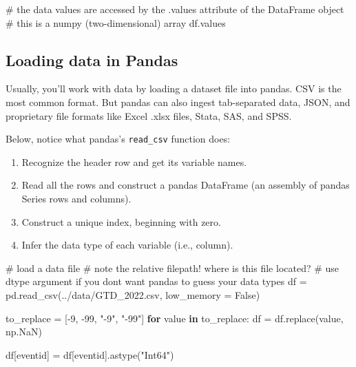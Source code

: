 \documentclass[
  letterpaper,
  DIV=11,
  numbers=noendperiod]{scrreprt}
\newenvironment{Shaded}{\begin{snugshade}}{\end{snugshade}}
\newcommand{\CommentTok}[1]{\textcolor[rgb]{0.37,0.37,0.37}{#1}}
\newcommand{\ControlFlowTok}[1]{\textcolor[rgb]{0.00,0.23,0.31}{\textbf{#1}}}
\newcommand{\DecValTok}[1]{\textcolor[rgb]{0.68,0.00,0.00}{#1}}
\newcommand{\KeywordTok}[1]{\textcolor[rgb]{0.00,0.23,0.31}{\textbf{#1}}}
\newcommand{\NormalTok}[1]{\textcolor[rgb]{0.00,0.23,0.31}{#1}}
\newcommand{\OperatorTok}[1]{\textcolor[rgb]{0.37,0.37,0.37}{#1}}
\newcommand{\StringTok}[1]{\textcolor[rgb]{0.13,0.47,0.30}{#1}}
\newcommand{\VariableTok}[1]{\textcolor[rgb]{0.07,0.07,0.07}{#1}}
\providecommand{\tightlist}{%
  \setlength{\itemsep}{0pt}\setlength{\parskip}{0pt}}\usepackage{longtable,booktabs,array}
\begin{document}
\begin{Shaded}
\begin{Highlighting}[]
\CommentTok{\# the data values are accessed by the .values attribute of the DataFrame object}
\CommentTok{\# this is a numpy (two{-}dimensional) array}
\NormalTok{df.values}
\end{Highlighting}
\end{Shaded}

\subsection{Loading data in Pandas}\label{loading-data-in-pandas}

Usually, you'll work with data by loading a dataset file into pandas.
CSV is the most common format. But pandas can also ingest tab-separated
data, JSON, and proprietary file formats like Excel .xlsx files, Stata,
SAS, and SPSS.

Below, notice what pandas's \texttt{read\_csv} function does:

\begin{enumerate}
\def\labelenumi{\arabic{enumi}.}
\tightlist
\item
  Recognize the header row and get its variable names.
\item
  Read all the rows and construct a pandas DataFrame (an assembly of
  pandas Series rows and columns).
\item
  Construct a unique index, beginning with zero.
\item
  Infer the data type of each variable (i.e., column).
\end{enumerate}

\begin{Shaded}
\begin{Highlighting}[]
\CommentTok{\# load a data file}
\CommentTok{\# note the relative filepath! where is this file located?}
\CommentTok{\# use dtype argument if you don\textquotesingle{}t want pandas to guess your data types}
\NormalTok{df }\OperatorTok{=}\NormalTok{ pd.read\_csv(}\StringTok{\textquotesingle{}../data/GTD\_2022.csv\textquotesingle{}}\NormalTok{, low\_memory }\OperatorTok{=} \VariableTok{False}\NormalTok{)}
\end{Highlighting}
\end{Shaded}

\begin{Shaded}
\begin{Highlighting}[]
\NormalTok{to\_replace }\OperatorTok{=}\NormalTok{ [}\OperatorTok{{-}}\DecValTok{9}\NormalTok{, }\OperatorTok{{-}}\DecValTok{99}\NormalTok{, }\StringTok{"{-}9"}\NormalTok{, }\StringTok{"{-}99"}\NormalTok{]}
\ControlFlowTok{for}\NormalTok{ value }\KeywordTok{in}\NormalTok{ to\_replace:}
\NormalTok{    df }\OperatorTok{=}\NormalTok{ df.replace(value, np.NaN)}

\NormalTok{df[}\StringTok{\textquotesingle{}eventid\textquotesingle{}}\NormalTok{] }\OperatorTok{=}\NormalTok{ df[}\StringTok{\textquotesingle{}eventid\textquotesingle{}}\NormalTok{].astype(}\StringTok{"Int64"}\NormalTok{)}
\end{Highlighting}
\end{Shaded}
\end{document}
